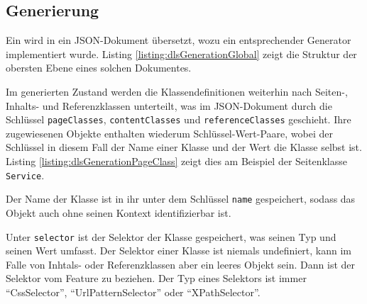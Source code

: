 \subsection{Generierung}
    \label{section:solutionDetailsDslGeneration}
    Ein {\classificationModel} wird in ein JSON-Dokument übersetzt,
    wozu ein entsprechender Generator implementiert wurde.
    Listing \ref{listing:dlsGenerationGlobal} zeigt die Struktur der
    obersten Ebene eines solchen Dokumentes.

    

    Im generierten Zustand werden die Klassendefinitionen weiterhin nach
    Seiten-, Inhalts- und Referenzklassen unterteilt,
    was im JSON-Dokument durch die Schlüssel \texttt{pageClasses},
    \texttt{contentClasses} und \texttt{referenceClasses} geschieht.
    Ihre zugewiesenen Objekte enthalten wiederum Schlüssel-Wert-Paare,
    wobei der Schlüssel in diesem Fall der Name einer Klasse und der
    Wert die Klasse selbst ist.
    Listing \ref{listing:dlsGenerationPageClass} zeigt dies am Beispiel
    der Seitenklasse \texttt{Service}.

    

    Der Name der Klasse ist in ihr unter dem Schlüssel \texttt{name} gespeichert,
    sodass das Objekt auch ohne seinen Kontext identifizierbar ist.

    Unter \texttt{selector} ist der Selektor der Klasse gespeichert,
    was seinen Typ und seinen Wert umfasst.
    Der Selektor einer Klasse ist niemals undefiniert,
    kann im Falle von Inhtals- oder Referenzklassen aber ein leeres Objekt sein.
    Dann ist der Selektor vom Feature zu beziehen.
    Der Typ eines Selektors ist immer "`CssSelector"', "`UrlPatternSelector"' oder "`XPathSelector"'.

